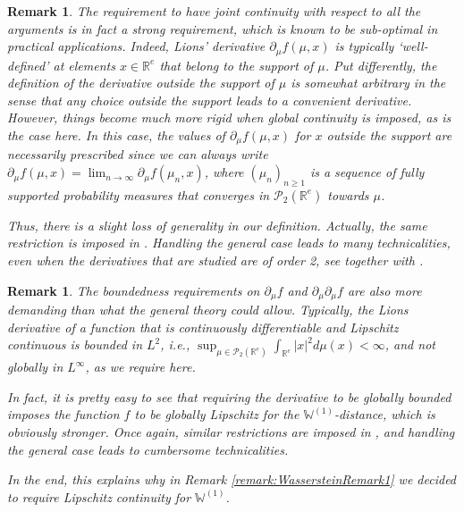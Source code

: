 \documentclass[a4paper,11pt,twoside]{article}
\numberwithin{equation}{section}
\theoremstyle{plain}
\newtheorem{remark}[theorem]{Remark}
\newcommand{\bR}{\mathbb{R}}
\newcommand{\bW}{\mathbb{W}}
\newcommand{\cP}{\mathcal{P}}
\newcommand{\1}{\mathbbm{1}}
\begin{document}
	\begin{remark}
		\label{remark:WassersteinRemark2}
		The requirement to have joint continuity with respect to all the arguments is in fact a strong requirement, which is known to be sub-optimal in practical applications. Indeed, Lions' derivative $\partial_{\mu} f(\mu,x)$ is typically `well-defined' at elements $x \in \bR^e$ that belong to the support of $\mu$. Put differently, the definition of the derivative outside the support of $\mu$ is somewhat arbitrary in the sense that any choice outside the support leads to a convenient  derivative. However, things become much more rigid when global continuity is imposed, as is the case here. In this case, the values of $\partial_{\mu} f(\mu,x)$ for $x$ outside the support are necessarily prescribed since we can always write $\partial_{\mu} f(\mu,x)=\lim_{n \rightarrow \infty} \partial_{\mu} f(\mu_{n},x)$, where $(\mu_{n})_{n \geq 1}$ is a sequence of fully supported probability measures that converges in $\cP_2(\bR^e)$ towards $\mu$. 
		
		Thus, there is a slight loss of generality in our definition. Actually, the same restriction is imposed in \cites{buckdahn2017mean, CarmonaDelarue2017book2, 2019arXiv180205882.2B}. Handling the general case leads to many technicalities, even when the derivatives that are studied are of order 2, see \cite{chassagneux2014classical} together with \cite{CarmonaDelarue2017book1}. 
	\end{remark}
	
	\begin{remark}
		\label{remark:WassersteinRemark3}
		The boundedness requirements on $\partial_{\mu} f$ and $\partial_{\mu} \partial_{\mu} f$ are also more demanding than what the general theory could allow. Typically, the Lions derivative of a function that is continuously differentiable and Lipschitz continuous is bounded in $L^2$, i.e., $\sup_{\mu \in \cP_{2}(\bR^e)} \int_{\bR^e} |x|^2 d\mu(x) < \infty$, and not globally in $L^\infty$, as we require here. 
		
		In fact, it is pretty easy to see that requiring the derivative to be globally bounded imposes the function $f$ to be globally Lipschitz for the $\bW^{(1)}$-distance, which is obviously stronger. Once again, similar restrictions are imposed in \cites{buckdahn2017mean, CarmonaDelarue2017book2, 2019arXiv180205882.2B}, and handling the general case leads to cumbersome technicalities. 
		
		In the end, this explains why in Remark \ref{remark:WassersteinRemark1} we decided to require Lipschitz continuity for $\bW^{(1)}$. 
	\end{remark}
	
\end{document}
